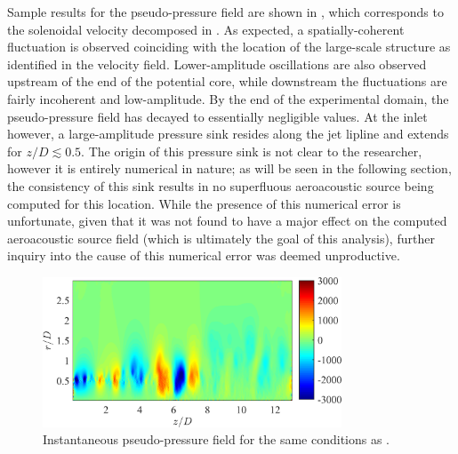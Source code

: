 Sample results for the pseudo-pressure field are shown in , which corresponds to the solenoidal velocity decomposed in .
As expected, a spatially-coherent fluctuation is observed coinciding with the location of the large-scale structure as identified in the velocity field.
Lower-amplitude oscillations are also observed upstream of the end of the potential core, while downstream the fluctuations are fairly incoherent and low-amplitude.
By the end of the experimental domain, the pseudo-pressure field has decayed to essentially negligible values.
At the inlet however, a large-amplitude pressure sink resides along the jet lipline and extends for $z/D \lesssim 0.5$.
The origin of this pressure sink is not clear to the researcher, however it is entirely numerical in nature; as will be seen in the following section, the consistency of this sink results in no superfluous aeroacoustic source being computed for this location.
While the presence of this numerical error is unfortunate, given that it was not found to have a major effect on the computed aeroacoustic source field (which is ultimately the goal of this analysis), further inquiry into the cause of this numerical error was deemed unproductive.
\begin{figure}
	\centering
	\includegraphics[width = 3.5in]{Figures/ch5_valid_Inst_ps.png}
	\caption{Instantaneous pseudo-pressure field for the same conditions as .}
	\label{fig:valid_pseudopressure}
\end{figure}
